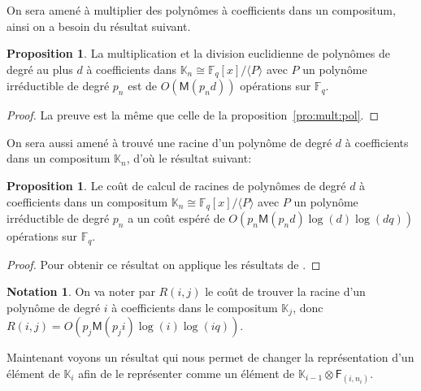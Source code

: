 \documentclass[10pt,a4paper]{book}
\theoremstyle{plain}
\theoremstyle{definition}
\theoremstyle{definition}
\theoremstyle{definition}
\newtheorem{prop}[thm]{Proposition}
\theoremstyle{definition}
\theoremstyle{remark}
\theoremstyle{remark}
\theoremstyle{definition}
\newtheorem{nota}[thm]{Notation}
\begin{document}
 On sera amené à multiplier des polynômes à coefficients dans un 
 compositum, ainsi on a besoin du résultat suivant.

 \begin{prop}
 \label{pro:mul:com}
 La multiplication et la division euclidienne de polynômes de degré au plus $d$
 à coefficients dans $\mathbb{K}_{n} \cong \mathbb{F}_q[x]/ \langle P \rangle$
 avec $P$ un polynôme irréductible de degré $p_n$ est de $O(\mathsf{M}(p_nd))$ 
 opérations sur $\mathbb{F}_q$.
 \end{prop} 
 
 \begin{proof}
 La preuve est la même que celle de la proposition~\ref{pro:mult:pol}.
 \end{proof}
 
 On sera aussi amené à trouvé une racine d'un polynôme de degré $d$ à 
 coefficients dans un compositum $\mathbb{K}_n$, d'où le résultat suivant:
 
\begin{prop}
\label{pro:rac:com}
 Le coût de calcul de racines de polynômes de degré $d$ à coefficients dans un 
 compositum $\mathbb{K}_{n} \cong \mathbb{F}_q[x]/ \langle P \rangle$
 avec $P$ un polynôme irréductible de degré $p_n$ a un coût espéré de 
 $O(p_n \mathsf{M}(p_nd)\log(d)\log(dq))$ opérations sur $\mathbb{F}_q$.
\end{prop}
 
\begin{proof}
Pour obtenir ce résultat on applique les résultats de \cite[Chapter 14.5]{vzGJG03}.
\end{proof}

\begin{nota}
On va noter par $R(i,j)$ le coût de trouver la racine d'un polynôme de degré 
$i$ à coefficients dans le compositum $\mathbb{K}_j$, donc 
$R(i,j)=O(p_j \mathsf{M}(p_ji)\log(i)\log(iq))$.
\end{nota}

Maintenant voyons un résultat qui nous permet de changer la 
représentation d'un élément de $\mathbb{K}_i$ afin de le représenter comme un 
élément de $\mathbb{K}_{i-1} \otimes \mathsf{F}_{(i,n_i)}$. 
\end{document}
